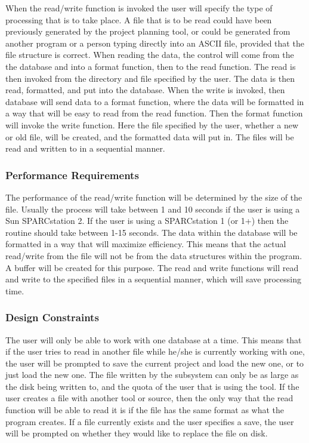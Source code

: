 When the read/write function is invoked the user will specify the type
of processing that is to take place. A file that is to be read could
have been previously generated by the project planning tool, or could
be generated from another program or a person typing directly into an
ASCII file, provided that the file structure is correct.  When reading
the data, the control will come from the the database and into a
format function, then to the read function. The read is then invoked
from the directory and file specified by the user. The data is then
read, formatted, and put into the database. When the write is invoked,
then database will send data to a format function, where the data will
be formatted in a way that will be easy to read from the read
function. Then the format function will invoke the write function.
Here the file specified by the user, whether a new or old file, will
be created, and the formatted data will put in. The files will be read
and written to in a sequential manner.

\subsubsection{Performance Requirements}

The performance of the read/write function will be determined by the
size of the file. Usually the process will take between 1 and 10
seconds if the user is using a Sun SPARCstation 2. If the user is
using a SPARCstation 1 (or 1+) then the routine should take between
1-15 seconds. The data within the database will be formatted in a way
that will maximize efficiency. This means that the actual read/write
from the file will not be from the data structures within the
program. A buffer will be created for this purpose. The read and write
functions will read and write to the specified files in a sequential
manner, which will save processing time.

\subsubsection{Design Constraints}

The user will only be able to work with one database at a time. This
means that if the user tries to read in another file while he/she is
currently working with one, the user will be prompted to save the
current project and load the new one, or to just load the new one.
The file written by the subsystem can only be as large as the disk
being written to, and the quota of the user that is using the tool.
If the user creates a file with another tool or source, then
the only way that the read function will be able to read it is if the
file has the same format as what the program creates. If a file
currently exists and the user specifies a save, the user will be
prompted on whether they would like to replace the file on disk.

